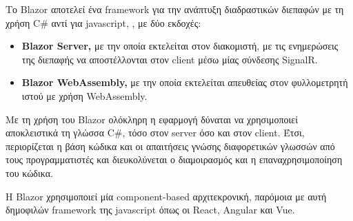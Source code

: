 Το Blazor αποτελεί ένα framework για την ανάπτυξη διαδραστικών διεπαφών με τη χρήση C\# αντί για javascript,
, με δύο εκδοχές:
\begin{itemize}
    \item \textbf{Blazor Server,} με την οποία εκτελείται στον διακομιστή, με τις ενημερώσεις της διεπαφής να
            αποστέλλονται στον client μέσω μίας σύνδεσης SignalR.
    \item \textbf{Blazor WebAssembly,} με την οποία εκτελείται απευθείας στον φυλλομετρητή ιστού με χρήση
            WebAssembly. 
\end{itemize}

Με τη χρήση του Blazor ολόκληρη η εφαρμογή δύναται να χρησιμοποιεί αποκλειστικά τη γλώσσα C\#, τόσο στον
server όσο και στον client. Έτσι, περιορίζεται η βάση κώδικα και οι απαιτήσεις γνώσης διαφορετικών γλωσσών 
από τους προγραμματιστές και διευκολύνεται ο διαμοιρασμός και η επαναχρησιμοποίηση του κώδικα.

Η Blazor χρησιμοποιεί μία component-based αρχιτεκρονική, παρόμοια με αυτή δημοφιλών framework της javascript
όπως οι React, Angular και Vue.